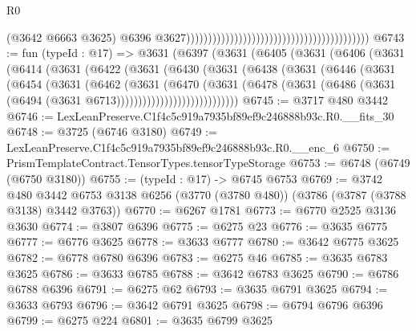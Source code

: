 \begin{lexlean}{R0}
\begin{coremodule}
                                                                                        (@3642
                                                                                          @6663
                                                                                          @3625)
                                                                                        @6396
                                                                                        @3627))))))))))))))))))))))))))))))))))))))))))
@6743 := fun (typeId : @17) =>
  @3631
    (@6397
      (@3631
        (@6405
          (@3631
            (@6406
              (@3631
                (@6414
                  (@3631
                    (@6422
                      (@3631
                        (@6430
                          (@3631
                            (@6438
                              (@3631
                                (@6446
                                  (@3631
                                    (@6454
                                      (@3631
                                        (@6462
                                          (@3631
                                            (@6470
                                              (@3631
                                                (@6478
                                                  (@3631
                                                    (@6486
                                                      (@3631
                                                        (@6494
                                                          (@3631 @6713))))))))))))))))))))))))))))
@6745 := @3717 @480 @3442
@6746 := LexLeanPreserve.C1f4c5c919a7935bf89ef9c246888b93c.R0.__fits_30
@6748 := @3725 (@6746 @3180)
@6749 := LexLeanPreserve.C1f4c5c919a7935bf89ef9c246888b93c.R0.__enc_6
@6750 := PrismTemplateContract.TensorTypes.tensorTypeStorage
@6753 := @6748 (@6749 (@6750 @3180))
@6755 := (typeId : @17) -> @6745 @6753
@6769 := @3742
    @480
    @3442
    @6753
    @3138
    @6256
    (@3770 (@3780 @480))
    (@3786 (@3787 (@3788 @3138) @3442 @3763))
@6770 := @6267 @1781
@6773 := @6770 @2525 @3136 @3630
@6774 := @3807 @6396
@6775 := @6275 @23
@6776 := @3635 @6775
@6777 := @6776 @3625
@6778 := @3633 @6777
@6780 := @3642 @6775 @3625
@6782 := @6778 @6780 @6396
@6783 := @6275 @46
@6785 := @3635 @6783 @3625
@6786 := @3633 @6785
@6788 := @3642 @6783 @3625
@6790 := @6786 @6788 @6396
@6791 := @6275 @62
@6793 := @3635 @6791 @3625
@6794 := @3633 @6793
@6796 := @3642 @6791 @3625
@6798 := @6794 @6796 @6396
@6799 := @6275 @224
@6801 := @3635 @6799 @3625

\end{coremodule}
\end{lexlean}

